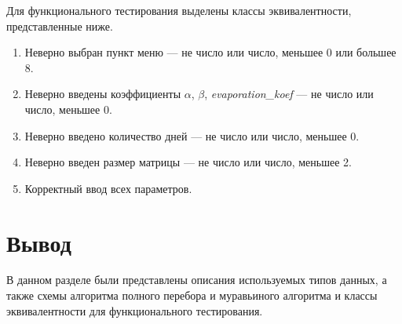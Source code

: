 Для функционального тестирования выделены классы эквивалентности, представленные ниже.

\begin{enumerate}
	\item Неверно выбран пункт меню --- не число или число, меньшее 0 или большее 8.
	\item Неверно введены коэффициенты $\alpha$, $\beta$, \textit{evaporation\_koef} --- не число или число, меньшее 0.
	\item Неверно введено количество дней --- не число или число, меньшее 0.
	\item Неверно введен размер матрицы --- не число или число, меньшее 2.
	\item Корректный ввод всех параметров.
\end{enumerate}


\section*{Вывод}

В данном разделе были представлены описания используемых типов данных, а также схемы алгоритма полного перебора и муравьиного алгоритма и классы эквивалентности для функционального тестирования.


